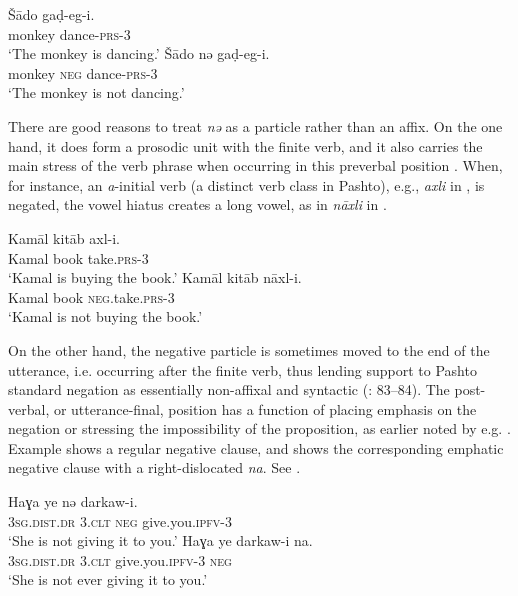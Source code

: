 \documentclass[output=paper,colorlinks,citecolor=brown]{langscibook}
\begin{document}
\ea\label{ex:pas:1}
    \ea\label{ex:pas:1a}
        \gll Š\={a}do gaḍ{}-eg{}-i.\\
             monkey dance{}-\textsc{prs-3}\\
        \glt ‘The monkey is dancing.’
    \ex\label{ex:pas:1b}
        \gll  Š\={a}do nə gaḍ-eg{}-i.\\
             monkey \textsc{neg} dance{}-\textsc{prs-3}\\
        \glt ‘The monkey is not dancing.’
    \z
\z 

There are good reasons to treat \textit{nə} as a particle rather than an affix. On the one hand, it does form a prosodic unit with the finite verb, and it also carries the main stress of the verb phrase when occurring in this preverbal position \citep[110]{Tegey1977}. When, for instance, an \textit{a}{}-initial verb (a distinct verb class in Pashto), e.g., \textit{axli} in , is negated, the vowel hiatus creates a long vowel, as in \textit{nāxli} in . 

\ea\label{ex:pas:2}
    \ea\label{ex:pas:2a}
        \gll Kamāl	kitāb	axl-i. \\
             Kamal book take.\textsc{prs{}-3}\\
        \glt ‘Kamal is buying the book.’
    \ex\label{ex:pas:2b}
        \gll Kamāl kitāb nāxl{}-i. \\
             Kamal book \textsc{neg}.take.\textsc{prs-3}\\
        \glt ‘Kamal is not buying the book.’
    \z
\z 

On the other hand, the negative particle is sometimes moved to the end of the utterance, i.e. occurring after the finite verb, thus lending support to Pashto standard negation as essentially non-affixal and syntactic (\citealt{Dahl1979}: 83–84). The post-verbal, or utterance{}-final, position has a function of placing emphasis on the negation or stressing the impossibility of the proposition, as earlier noted by e.g. \citet[398]{Skjaervø1989b}. Example  shows a regular negative clause, and  shows the corresponding emphatic negative clause with a right-dislocated \textit{na}. See .

\ea\label{ex:pas:3}
    \ea\label{ex:pas:3a}
        \gll Haɣa ye nə darkaw-i. \\
            \textsc{3sg.dist.dr} \textsc{3.clt} \textsc{neg} give.you.\textsc{ipfv-3} \\
        \glt ‘She is not giving it to you.’ 
    \ex\label{ex:pas:3b}
        \gll Haɣa ye darkaw-i na. \\
             \textsc{3sg.dist.dr} \textsc{3.clt} give.you.\textsc{ipfv-3} \textsc{neg}\\
        \glt ‘She is not ever giving it to you.’
    \z
\z 
\end{document}
